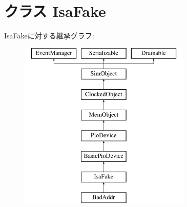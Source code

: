\hypertarget{classDevice_1_1IsaFake}{
\section{クラス IsaFake}
\label{classDevice_1_1IsaFake}
}
IsaFakeに対する継承グラフ:\begin{figure}[H]
\begin{center}
\leavevmode
\includegraphics[height=8cm]{classDevice_1_1IsaFake}
\end{center}
\end{figure}
